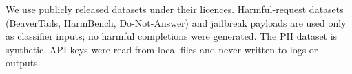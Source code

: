 We use publicly released datasets under their licences. Harmful-request datasets (BeaverTails, HarmBench, Do-Not-Answer) and jailbreak payloads are used only as classifier inputs; no harmful completions were generated. The PII dataset is synthetic. API keys were read from local files and never written to logs or outputs.
